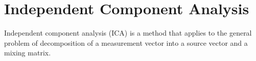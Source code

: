 \section{Independent Component Analysis}\label{sec:ICA}
Independent component analysis (ICA) is a method that applies to  the general problem of decomposition of a measurement vector into a source vector and a mixing matrix. 
